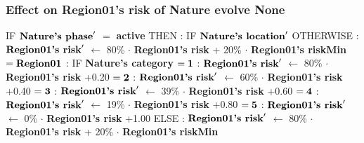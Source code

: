 \documentclass{article}%
\begin{document}
%
\subsubsection{Effect on Region01's risk of Nature evolve None}%
\label{ssubsec:Effect on Region01's risk of Nature evolve None}%
\begin{flushleft}%
IF %
$\mbox{\textbf{Nature's phase}} '$%
$=$%
\textbf{active}%
\linebreak%
\hspace*{2em}%
THEN %
: %
IF %
$\mbox{\textbf{Nature's location}} '$%
\linebreak%
\hspace*{4em}%
OTHERWISE %
: %
$\mbox{\textbf{Region01's risk}} '$%
$\leftarrow$%
80\%%
$\cdot$%
\textbf{Region01's risk}%
+%
20\%%
$\cdot$%
\textbf{Region01's riskMin}%
\linebreak%
\hspace*{4em}%
$= \mbox{\textbf{Region01}}$%
: %
IF %
\textbf{Nature's category}%
\linebreak%
\hspace*{6em}%
$= \mbox{\textbf{1}}$%
: %
$\mbox{\textbf{Region01's risk}} '$%
$\leftarrow$%
80\%%
$\cdot$%
\textbf{Region01's risk}%
+0.20%
\linebreak%
\hspace*{6em}%
$= \mbox{\textbf{2}}$%
: %
$\mbox{\textbf{Region01's risk}} '$%
$\leftarrow$%
60\%%
$\cdot$%
\textbf{Region01's risk}%
+0.40%
\linebreak%
\hspace*{6em}%
$= \mbox{\textbf{3}}$%
: %
$\mbox{\textbf{Region01's risk}} '$%
$\leftarrow$%
39\%%
$\cdot$%
\textbf{Region01's risk}%
+0.60%
\linebreak%
\hspace*{6em}%
$= \mbox{\textbf{4}}$%
: %
$\mbox{\textbf{Region01's risk}} '$%
$\leftarrow$%
19\%%
$\cdot$%
\textbf{Region01's risk}%
+0.80%
\linebreak%
\hspace*{6em}%
$= \mbox{\textbf{5}}$%
: %
$\mbox{\textbf{Region01's risk}} '$%
$\leftarrow$%
0\%%
$\cdot$%
\textbf{Region01's risk}%
+1.00%
\linebreak%
\hspace*{2em}%
ELSE %
: %
$\mbox{\textbf{Region01's risk}} '$%
$\leftarrow$%
80\%%
$\cdot$%
\textbf{Region01's risk}%
+%
20\%%
$\cdot$%
\textbf{Region01's riskMin}%
\end{flushleft}

%
\end{document}
